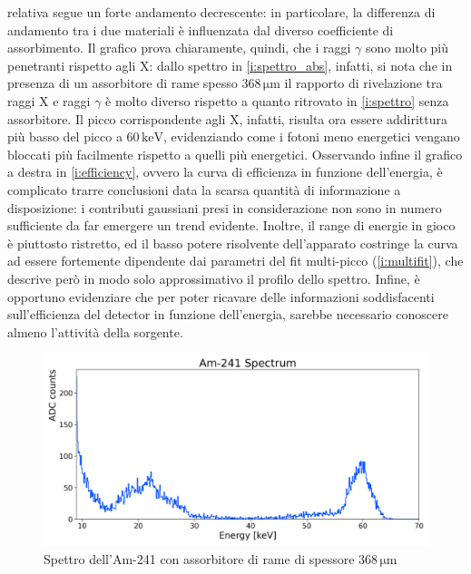 \documentclass[twocolumn,10pt]{asme2ej}
\begin{document}
relativa segue un forte andamento decrescente: in particolare, la differenza di andamento tra i due materiali è
influenzata dal diverso coefficiente di assorbimento. Il grafico prova chiaramente, quindi, che i raggi $\gamma$ sono
molto più penetranti rispetto agli X: dallo spettro in \autoref{i:spettro_abs}, infatti, si nota che in presenza di un
assorbitore di rame spesso $368\,\si{\micro\metre}$ il rapporto di rivelazione tra raggi X e raggi $\gamma$ è molto
diverso rispetto a quanto ritrovato in \autoref{i:spettro} senza assorbitore. Il picco corrispondente agli X, infatti,
risulta ora essere addirittura più basso del picco a $60\,\si{\kilo\electronvolt}$, evidenziando come i fotoni meno
energetici vengano bloccati più facilmente rispetto a quelli più energetici. Osservando infine il grafico a destra in
\autoref{i:efficiency}, ovvero la curva di efficienza in funzione dell'energia, è complicato trarre conclusioni data la
scarsa quantità di informazione a disposizione: i contributi gaussiani presi in considerazione non sono in numero
sufficiente da far emergere un trend evidente. Inoltre, il range di energie in gioco è piuttosto ristretto, ed il basso
potere risolvente dell'apparato costringe la curva ad essere fortemente dipendente dai parametri del fit multi-picco
(\autoref{i:multifit}), che descrive però in modo solo approssimativo il profilo dello spettro. Infine, è opportuno
evidenziare che per poter ricavare delle informazioni soddisfacenti sull'efficienza del detector in funzione
dell'energia, sarebbe necessario conoscere almeno l'attività della sorgente. 

\pagebreak 

\begin{figure}
    \centering
    \includegraphics[width=\linewidth]{../Plots/am_spectrum_absorber.png}
    \caption{Spettro dell'Am-241 con assorbitore di rame di spessore $368\,\si{\micro\metre}$}
    \label{i:spettro_abs}
    \vspace{-10pt}
\end{figure}

\null
\vfill
\end{document}
